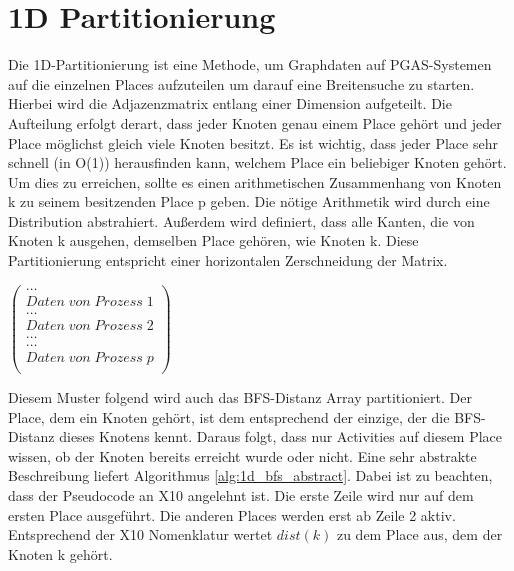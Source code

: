 
\section{1D Partitionierung} %
\label{sec:1d_partitionierung}
Die 1D-Partitionierung ist eine Methode, um Graphdaten auf PGAS-Systemen auf die einzelnen Places aufzuteilen um darauf eine Breitensuche zu starten. Hierbei wird die Adjazenzmatrix entlang einer Dimension aufgeteilt. Die Aufteilung erfolgt derart, dass jeder Knoten genau einem Place gehört und jeder Place möglichst gleich viele Knoten besitzt. Es ist wichtig, dass jeder Place sehr schnell (in O(1)) herausfinden kann, welchem Place ein beliebiger Knoten gehört. Um dies zu erreichen, sollte es einen arithmetischen Zusammenhang von Knoten k zu seinem besitzenden Place p geben. Die nötige Arithmetik wird durch eine Distribution abstrahiert. Außerdem wird definiert, dass alle Kanten, die von Knoten k ausgehen, demselben Place gehören, wie Knoten k. Diese Partitionierung entspricht einer horizontalen Zerschneidung der Matrix.

\begin{center}
$\left( \begin{array}{c}
	\dots \\ Daten\;von\;Prozess\;1 \\	\hline
	\dots \\ Daten\;von\;Prozess\;2 \\	\hline
	\dots \\	\hline
	\dots \\ Daten\;von\;Prozess\;p \\
\end{array} \right)$
\end{center}

Diesem Muster folgend wird auch das BFS-Distanz Array partitioniert. Der Place, dem ein Knoten gehört, ist dem entsprechend der einzige, der die BFS-Distanz dieses Knotens kennt. Daraus folgt, dass nur Activities auf diesem Place wissen, ob der Knoten bereits erreicht wurde oder nicht. Eine sehr abstrakte Beschreibung liefert Algorithmus \ref{alg:1d_bfs_abstract}. Dabei ist zu beachten, dass der Pseudocode an X10 angelehnt ist. Die erste Zeile wird nur auf dem ersten Place ausgeführt. Die anderen Places werden erst ab Zeile 2 aktiv. Entsprechend der X10 Nomenklatur wertet $dist(k)$ zu dem Place aus, dem der Knoten k gehört.

